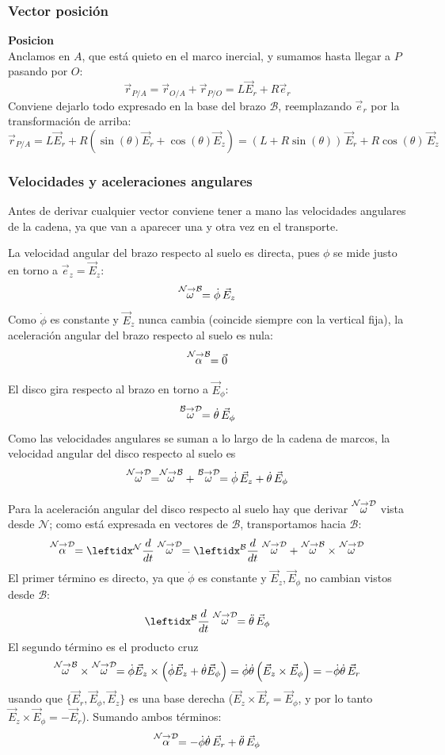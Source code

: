 \begin{tcolorbox}[%
        title= Solucion Disco en barra rotatoria vertical, breakable]
\subsubsection*{Vector posición}

\textbf{Posicion}\\
Anclamos en $A$, que está quieto en el marco inercial, y sumamos hasta llegar a $P$ pasando por
$O$:
$$\vec{r}_{P/A}=\vec{r}_{O/A}+\vec{r}_{P/O}=L\vec{E}_r+R\vec{e}_r$$
Conviene dejarlo todo expresado en la base del brazo $\mathcal{B}$, reemplazando $\vec{e}_r$ por
la transformación de arriba:
$$\vec{r}_{P/A}=L\vec{E}_r+R\left(\sin(\theta)\vec{E}_r+\cos(\theta)\vec{E}_z\right)=(L+R\sin(\theta))\,\vec{E}_r+R\cos(\theta)\,\vec{E}_z$$

\subsubsection*{Velocidades y aceleraciones angulares}

Antes de derivar cualquier vector conviene tener a mano las velocidades angulares de la cadena,
ya que van a aparecer una y otra vez en el transporte.

La velocidad angular del brazo respecto al suelo es directa, pues $\phi$ se mide justo en torno a
$\vec{e}_z=\vec{E}_z$:
$$\stackrel{\mathcal{N} \to \mathcal{B}}{\omega}=\dot\phi\,\vec{E}_z$$
Como $\dot\phi$ es constante y $\vec{E}_z$ nunca cambia (coincide siempre con la vertical fija),
la aceleración angular del brazo respecto al suelo es nula:
$$\stackrel{\mathcal{N} \to \mathcal{B}}{\alpha}=\vec{0}$$

El disco gira respecto al brazo en torno a $\vec{E}_\phi$:
$$\stackrel{\mathcal{B} \to \mathcal{D}}{\omega}=\dot\theta\,\vec{E}_\phi$$
Como las velocidades angulares se suman a lo largo de la cadena de marcos, la velocidad angular
del disco respecto al suelo es
$$\stackrel{\mathcal{N} \to \mathcal{D}}{\omega}=\stackrel{\mathcal{N} \to \mathcal{B}}{\omega}+\stackrel{\mathcal{B} \to \mathcal{D}}{\omega}=\dot\phi\,\vec{E}_z+\dot\theta\,\vec{E}_\phi$$

Para la aceleración angular del disco respecto al suelo hay que derivar $\stackrel{\mathcal{N} \to \mathcal{D}}{\omega}$ vista
desde $\mathcal{N}$; como está expresada en vectores de $\mathcal{B}$, transportamos hacia
$\mathcal{B}$:
$$\accang{N}{D}=\der{}{N}\velang{N}{D}=\der{}{B}\velang{N}{D}+\velang{N}{B}\times\velang{N}{D}$$
El primer término es directo, ya que $\dot\phi$ es constante y $\vec{E}_z,\vec{E}_\phi$ no cambian
vistos desde $\mathcal{B}$:
$$\der{}{B}\velang{N}{D}=\ddot\theta\,\vec{E}_\phi$$
El segundo término es el producto cruz
$$\stackrel{\mathcal{N} \to \mathcal{B}}{\omega}\times\stackrel{\mathcal{N} \to \mathcal{D}}{\omega}=\dot\phi\vec{E}_z\times\left(\dot\phi\vec{E}_z+\dot\theta\vec{E}_\phi\right)=\dot\phi\dot\theta\left(\vec{E}_z\times\vec{E}_\phi\right)=-\dot\phi\dot\theta\,\vec{E}_r$$
usando que $\{\vec{E}_r,\vec{E}_\phi,\vec{E}_z\}$ es una base derecha ($\vec{E}_z\times\vec{E}_r=\vec{E}_\phi$, y por lo tanto $\vec{E}_z\times\vec{E}_\phi=-\vec{E}_r$). Sumando ambos términos:
$$\stackrel{\mathcal{N} \to \mathcal{D}}{\alpha}=-\dot\phi\dot\theta\,\vec{E}_r+\ddot\theta\,\vec{E}_\phi$$


\end{tcolorbox}
